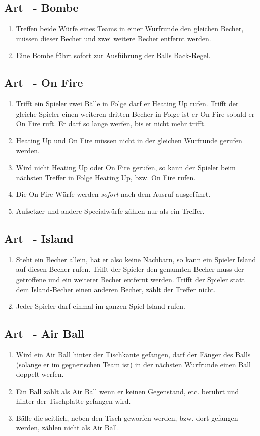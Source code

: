 \documentclass[a4paper,11pt]{scrartcl}
\newcommand{\enum}[1]{\begin{enumerate}[label=(\arabic*)]#1\end{enumerate}}
\newcommand{\art}[2]{\subsection*{#1} \enum{#2}}
\newcommand{\quot}[1]{\glqq #1\grqq}
\newcounter{art}
\begin{document}
    \art{Art \theart\ - \quot{Bombe}}{
        \item
            Treffen beide Würfe eines Teams in einer Wurfrunde den gleichen Becher, müssen dieser Becher und zwei weitere Becher entfernt werden.
        \item
            Eine \quot{Bombe} führt sofort zur Ausführung der \quot{Balls Back}-Regel.
    }

    \art{Art \theart\ - \quot{On Fire}}{
        \item
            Trifft ein Spieler zwei Bälle in Folge darf er \quot{Heating Up} rufen. Trifft der gleiche Spieler einen weiteren dritten Becher in Folge ist er \quot{On Fire} sobald er \quot{On Fire} ruft. Er darf so lange werfen, bis er nicht mehr trifft.
        \item
            \quot{Heating Up} und \quot{On Fire} müssen nicht in der gleichen Wurfrunde gerufen werden.
        \item
            Wird nicht \quot{Heating Up} oder \quot{On Fire} gerufen, so kann der Spieler beim nächsten Treffer in Folge \quot{Heating Up}, bzw. \quot{On Fire} rufen.
        \item
            Die \quot{On Fire}-Würfe werden \emph{sofort} nach dem Ausruf ausgeführt.
        \item
            Aufsetzer und andere Specialwürfe zählen nur als ein Treffer.
    }

    \art{Art \theart\ - \quot{Island}}{
        \item
            Steht ein Becher allein, hat er also keine Nachbarn, so kann ein Spieler \quot{Island} auf diesen Becher rufen. Trifft der Spieler den genannten Becher muss der getroffene und ein weiterer Becher entfernt werden. Trifft der Spieler statt dem \quot{Island}-Becher einen anderen Becher, zählt der Treffer nicht.
        \item
            Jeder Spieler darf einmal im ganzen Spiel \quot{Island} rufen.
    }

    \art{Art \theart\ - \quot{Air Ball}}{
        \item
            Wird ein \quot{Air Ball} hinter der Tischkante gefangen, darf der Fänger des Balls (solange er im gegnerischen Team ist) in der nächsten Wurfrunde einen Ball doppelt werfen.
        \item
            Ein Ball zählt als \quot{Air Ball} wenn er keinen Gegenstand, etc. berührt und hinter der Tischplatte gefangen wird.
        \item
            Bälle die seitlich, neben den Tisch geworfen werden, bzw. dort gefangen werden, zählen nicht als \quot{Air Ball}.
    }
\end{document}
